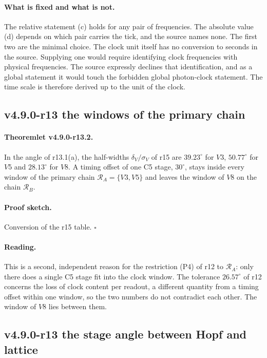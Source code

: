 \paragraph{What is fixed and what is not.}
The relative statement (c) holds for any pair of frequencies.  The absolute value (d) depends on which pair carries the
tick, and the source names none.  The first two are the minimal choice.  The clock unit itself has no conversion to
seconds in the source.  Supplying one would require identifying clock frequencies with physical frequencies.  The source
expressly declines that identification, and as a global statement it would touch the forbidden global photon-clock
statement.  The time scale is therefore derived up to the unit of the clock.

\subsection*{v4.9.0-r13 the windows of the primary chain}
\label{subsec:v490-r13-windows}

\paragraph{Theoremlet v4.9.0-r13.2.}
In the angle of r13.1(a), the half-widths \(\delta_V/\sigma_V\) of r15 are \(39.23^\circ\) for \(V3\), \(50.77^\circ\) for \(V5\)
and \(28.13^\circ\) for \(V8\).  A timing offset of one C5 stage, \(30^\circ\), stays inside every window of the primary chain
\(\mathcal R_A=\{V3,V5\}\) and leaves the window of \(V8\) on the chain \(\mathcal R_B\).

\paragraph{Proof sketch.}
Conversion of the r15 table.  \(\square\)

\paragraph{Reading.}
This is a second, independent reason for the restriction (P4) of r12 to \(\mathcal R_A\): only there does a single C5 stage
fit into the clock window.  The tolerance \(26.57^\circ\) of r12 concerns the loss of clock content per readout, a different
quantity from a timing offset within one window, so the two numbers do not contradict each other.  The window of \(V8\)
lies between them.

\subsection*{v4.9.0-r13 the stage angle between Hopf and lattice}
\label{subsec:v490-r13-hopf-lattice}

